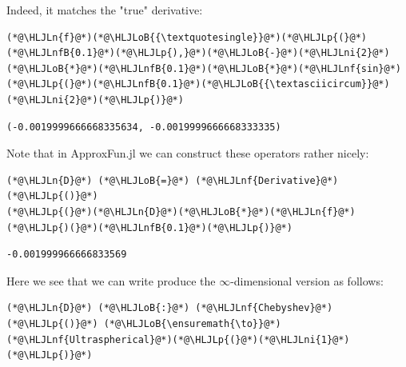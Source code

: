 \documentclass[12pt,a4paper]{article}
\newcommand{\HLJLn}[1]{#1}
\newcommand{\HLJLnf}[1]{\textcolor[RGB]{66,102,213}{#1}}
\newcommand{\HLJLnfB}[1]{\textcolor[RGB]{59,151,46}{#1}}
\newcommand{\HLJLni}[1]{\textcolor[RGB]{59,151,46}{#1}}
\newcommand{\HLJLoB}[1]{\textcolor[RGB]{102,102,102}{\textbf{#1}}}
\newcommand{\HLJLp}[1]{#1}
\begin{document}
Indeed, it matches the "true" derivative:


\begin{lstlisting}
(*@\HLJLn{f}@*)(*@\HLJLoB{{\textquotesingle}}@*)(*@\HLJLp{(}@*)(*@\HLJLnfB{0.1}@*)(*@\HLJLp{),}@*)(*@\HLJLoB{-}@*)(*@\HLJLni{2}@*)(*@\HLJLoB{*}@*)(*@\HLJLnfB{0.1}@*)(*@\HLJLoB{*}@*)(*@\HLJLnf{sin}@*)(*@\HLJLp{(}@*)(*@\HLJLnfB{0.1}@*)(*@\HLJLoB{{\textasciicircum}}@*)(*@\HLJLni{2}@*)(*@\HLJLp{)}@*)
\end{lstlisting}

\begin{lstlisting}
(-0.0019999666668335634, -0.0019999666668333335)
\end{lstlisting}


Note that in ApproxFun.jl we can construct these operators rather nicely:


\begin{lstlisting}
(*@\HLJLn{D}@*) (*@\HLJLoB{=}@*) (*@\HLJLnf{Derivative}@*)(*@\HLJLp{()}@*)
(*@\HLJLp{(}@*)(*@\HLJLn{D}@*)(*@\HLJLoB{*}@*)(*@\HLJLn{f}@*)(*@\HLJLp{)(}@*)(*@\HLJLnfB{0.1}@*)(*@\HLJLp{)}@*)
\end{lstlisting}

\begin{lstlisting}
-0.001999966666833569
\end{lstlisting}


Here we see that we can write produce the \ensuremath{\infty}-dimensional version as follows:


\begin{lstlisting}
(*@\HLJLn{D}@*) (*@\HLJLoB{:}@*) (*@\HLJLnf{Chebyshev}@*)(*@\HLJLp{()}@*) (*@\HLJLoB{\ensuremath{\to}}@*) (*@\HLJLnf{Ultraspherical}@*)(*@\HLJLp{(}@*)(*@\HLJLni{1}@*)(*@\HLJLp{)}@*)
\end{lstlisting}
\end{document}
